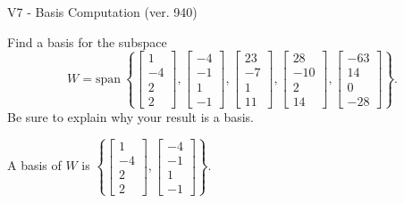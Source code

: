 \begin{exercise}
  \begin{exerciseTitle}V7 - Basis Computation (ver. 940)\end{exerciseTitle}
  \begin{exerciseStatement}
    Find a basis for the subspace 
\[W=\mathrm{span}\ \left\{\left[\begin{array}{r}
1 \\
-4 \\
2 \\
2
\end{array}\right] , \left[\begin{array}{r}
-4 \\
-1 \\
1 \\
-1
\end{array}\right] , \left[\begin{array}{r}
23 \\
-7 \\
1 \\
11
\end{array}\right] , \left[\begin{array}{r}
28 \\
-10 \\
2 \\
14
\end{array}\right] , \left[\begin{array}{r}
-63 \\
14 \\
0 \\
-28
\end{array}\right]\right\}.\]
 Be sure to explain why your result is a basis.


  \end{exerciseStatement}
  \begin{exerciseAnswer}
   A basis of \(W\) is  \(\left\{\left[\begin{array}{r}
1 \\
-4 \\
2 \\
2
\end{array}\right] , \left[\begin{array}{r}
-4 \\
-1 \\
1 \\
-1
\end{array}\right]\right\}\).
  


  \end{exerciseAnswer}
\end{exercise}